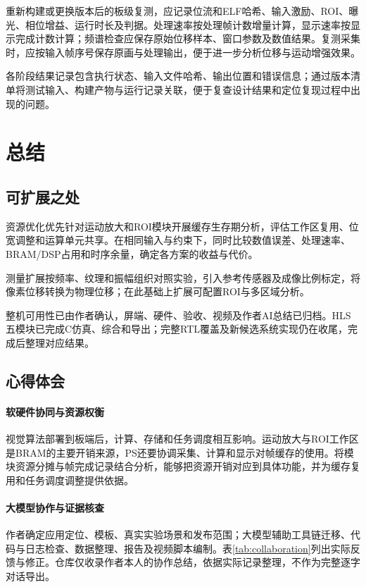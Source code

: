 \documentclass[UTF8,a4paper,zihao=-4,fontset=none]{ctexart}
\numberwithin{figure}{section}
\numberwithin{table}{section}
\begin{document}
重新构建或更换版本后的板级复测，应记录位流和ELF哈希、输入激励、ROI、曝光、相位增益、运行时长及判据。处理速率按处理帧计数增量计算，显示速率按显示完成计数计算；频谱检查应保存原始位移样本、窗口参数及数值结果。复测采集时，应按输入帧序号保存原画与处理输出，便于进一步分析位移与运动增强效果。

各阶段结果记录包含执行状态、输入文件哈希、输出位置和错误信息；通过版本清单将测试输入、构建产物与运行记录关联，便于复查设计结果和定位复现过程中出现的问题。

\FloatBarrier
\section{总结}
\label{sec:conclusion}

\subsection{可扩展之处}
资源优化优先针对运动放大和ROI模块开展缓存生存期分析，评估工作区复用、位宽调整和运算单元共享。在相同输入与约束下，同时比较数值误差、处理速率、BRAM/DSP占用和时序余量，确定各方案的收益与代价。

测量扩展按频率、纹理和振幅组织对照实验，引入参考传感器及成像比例标定，将像素位移转换为物理位移；在此基础上扩展可配置ROI与多区域分析。

整机可用性已由作者确认，屏端、硬件、验收、视频及作者AI总结已归档。HLS五模块已完成C仿真、综合和导出；完整RTL覆盖及新候选系统实现仍在收尾，完成后整理对应结果。

\subsection{心得体会}
\paragraph{软硬件协同与资源权衡}
视觉算法部署到板端后，计算、存储和任务调度相互影响。运动放大与ROI工作区是BRAM的主要开销来源，PS还要协调采集、计算和显示对帧缓存的使用。将模块资源分摊与帧完成记录结合分析，能够把资源开销对应到具体功能，并为缓存复用和任务调度调整提供依据。

\paragraph{大模型协作与证据核查}
作者确定应用定位、模板、真实实验场景和发布范围；大模型辅助工具链迁移、代码与日志检查、数据整理、报告及视频脚本编制。表\ref{tab:collaboration}列出实际反馈与修正。仓库仅收录作者本人的协作总结，依据实际记录整理，不作为完整逐字对话导出。
\end{document}
